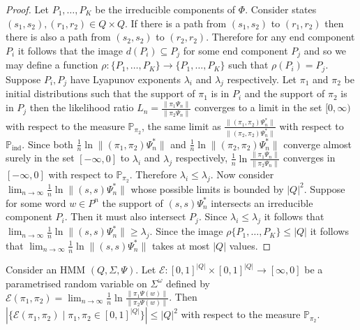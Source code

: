 \documentclass[a4paper,UKenglish,cleveref, autoref,mathscr]{lipics-v2019}
\newcommand{\Epsilon}{\mathcal{E}}
\newcommand{\PP}{\mathbb{P}}
\newcommand{\1}{\mathbbm{1}}
\begin{document}
\begin{proof}
Let $P_1, \dots, P_K$ be the irreducible components of $\Phi$. Consider states $(s_1, s_2), (r_1, r_2) \in Q \times Q$. If there is a path from $(s_1, s_2)$ to $(r_1, r_2)$ then there is also a path from $(s_2, s_2)$ to $(r_2, r_2)$. Therefore for any end component $P_i$ it follows that the image $d(P_i) \subseteq P_j$ for some end component $P_j$ and so we may define a function $\rho : \{ P_1, \dots, P_K \} \rightarrow \{ P_1, \dots, P_K \}$ such that $\rho(P_i) = P_j$. Suppose $P_i, P_j$ have Lyapunov exponents $\lambda_i$ and $\lambda_j$ respectively. Let $\pi_1$ and $\pi_2$ be initial distributions such that the support of $\pi_1$ is in $P_i$ and the support of $\pi_2$ is in $P_j$ then the likelihood ratio $L_n = \frac{\| \pi_1 \Psi_n \|}{\| \pi_2 \Psi_n \|}$ converges to a limit in the set $[0,\infty)$ with respect to the measure $\PP_{\pi_2}$, the same limit as $\frac{\| (\pi_1, \pi_2) \Psi_n^* \|}{\| (\pi_2, \pi_2) \Psi_n^* \|}$ with respect to $\PP_\text{ind}$. Since both $\frac{1}{n} \ln \| (\pi_1, \pi_2) \Psi_n^* \|$ and $\frac{1}{n} \ln \| (\pi_2, \pi_2) \Psi_n^* \|$ converge almost surely in the set $[-\infty, 0]$ to $\lambda_i$ and $\lambda_j$ respectively, $\frac{1}{n} \ln \frac{\| \pi_1 \Psi_n \|}{\| \pi_2 \Psi_n \|}$ converges in $[-\infty, 0]$ with respect to $\PP_{\pi_2}$. Therefore $\lambda_i \leq \lambda_j$.
Now consider $\lim_{n \rightarrow \infty} \frac1n \ln \|  (s, s) \Psi_n^* \|$ whose possible limits is bounded by $|Q|^2$. Suppose for some word $w \in P^n$ the support of $(s, s) \Psi_n^*$ intersects an irreducible component $P_i$. Then it must also intersect $P_j$. Since $\lambda_i \leq \lambda_j$ it follows that $\lim_{n \rightarrow \infty} \frac1n \ln \|  (s, s) \Psi_n^* \| \geq \lambda_j$. Since the image $\rho \{P_1, \dots, P_K \} \leq |Q|$ it follows that $\lim_{n \rightarrow \infty} \frac1n \ln \|  (s, s) \Psi_n^* \|$ takes at most $|Q|$ values.
\end{proof}

\begin{lemma}\label{qsquaredboundlike}
Consider an HMM $(Q, \Sigma, \Psi)$. Let $\Epsilon : [0,1]^{|Q|} \times [0,1]^{|Q|} \rightarrow [\infty, 0]$ be a parametrised random variable on $\Sigma^\omega$ defined by $\Epsilon(\pi_1, \pi_2) = \lim_{n \rightarrow \infty} \frac1n \ln \frac{\| \pi_1 \Psi(w) \|}{\|\pi_2 \Psi(w) \|}$. Then $|\{\Epsilon(\pi_1, \pi_2) \mid \pi_1, \pi_2 \in [0,1]^{|Q|}\} | \leq |Q|^2$ with respect to the measure $\PP_{\pi_2}$.
\end{lemma}
\end{document}
